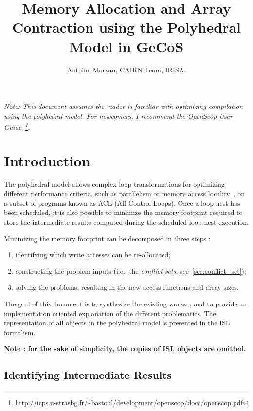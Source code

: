 \documentclass{article}
\title{Memory Allocation and Array Contraction using the Polyhedral Model in
GeCoS}
\author{Antoine Morvan, CAIRN Team,
IRISA, \email{antoine.morvan@irisa.fr}}
\begin{document}
\maketitle

\emph{Note: This document assumes the reader is familiar with optimizing
compilation using the polyhedral model. For newcomers, I recommend the OpenScop
User Guide~\footnote{\url{http://icps.u-strasbg.fr/~bastoul/development/openscop/docs/openscop.pdf}}.}


{\center\noindent\makebox[\linewidth]{\rule{0.7\paperwidth}{0.4pt}}}\tableofcontents
{\center\noindent\makebox[\linewidth]{\rule{0.7\paperwidth}{0.4pt}}}

\section{Introduction}

The polyhedral model allows complex loop transformations for optimizing
different performance criteria, such as parallelism or memory access
locality~\cite{feautrier1991dataflow, benabderrahmane2010polyhedral,
bondhugula2008pluto}, on a subset of programs known as ACL (Aff Control
Loops). Once a loop nest has been scheduled, it is also possible to minimize the
memory footprint required to store the intermediate results computed during the
scheduled loop nest execution. 

Minimizing the memory footprint can be decomposed in three steps :
\begin{enumerate}
  \item identifying which write accesses can be re-allocated;
  \item constructing the problem inputs (i.e., the \emph{conflict sets},
  see~\ref{sec:conflict_set});
  \item solving the problems, resulting in the new access functions and array
  sizes.
\end{enumerate}

The goal of this document is to synthesize the existing
works~\cite{LefebvreFeautrier, BeeAlias07}, and to provide an implementation
oriented explanation of the different problematics. The representation of all
objects in the polyhedral model is presented in the ISL~\cite{SvenISL10}
formalism.

\vspace{0.5cm}
{\bf Note : for the sake of simplicity, the copies of ISL objects are omitted.}

\subsection*{Identifying Intermediate Results}
\end{document}
